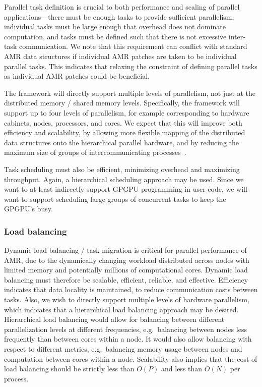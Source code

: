 \documentclass[10pt,twocolumn]{article}
\begin{document}
Parallel task definition is crucial to both performance and scaling of
parallel applications---there must be enough tasks to provide
sufficient parallelism, individual tasks must be large enough that
overhead does not dominate computation, and tasks must be defined such
that there is not excessive inter-task communication.  We note that
this requirement can conflict with standard AMR data structures if
individual AMR patches are taken to be individual parallel tasks.
This indicates that relaxing the constraint of defining parallel tasks
as individual AMR patches could be beneficial.

The framework will directly support multiple levels of parallelism,
not just at the distributed memory / shared memory levels.
Specifically, the framework will support up to four levels of
parallelism, for example corresponding to hardware cabinets, nodes,
processors, and cores.  We expect that this will improve both
efficiency and scalability, by allowing more flexible mapping of the
distributed data structures onto the hierarchical parallel hardware,
and by reducing the maximum size of groups of intercommunicating
processes~\cite{BaBu09}.

Task scheduling must also be efficient, minimizing overhead and
maximizing throughput.  Again, a hierarchical scheduling approach may
be used.  Since we want to at least indirectly support GPGPU
programming in user code, we will want to support scheduling large
groups of concurrent tasks to keep the GPGPU's busy.

\subsubsection{Load balancing} \label{ss:require-balance}

Dynamic load balancing / task migration is critical for parallel
performance of AMR, due to the dynamically changing workload
distributed across nodes with limited memory and potentially millions
of computational cores.  Dynamic load balancing must therefore be
scalable, efficient, reliable, and effective.  Efficiency indicates
that data locality is maintained, to reduce communication costs
between tasks.  Also, we wish to directly support multiple levels of
hardware parallelism, which indicates that a hierarchical load
balancing approach may be desired.  Hierarchical load balancing would
allow for balancing between different parallelization levels at
different frequencies, e.g.~balancing between nodes less frequently
than between cores within a node.  It would also allow balancing with
respect to different metrics, e.g.~balancing memory usage between
nodes and computation between cores within a node.  Scalability also
implies that the cost of load balancing should be strictly less than
$O(P)$ and less than $O(N)$ per process.
\end{document}
